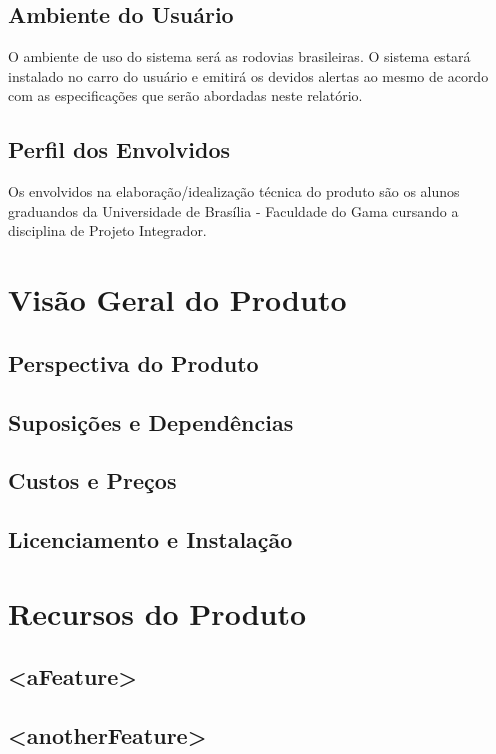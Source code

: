\subsection{Ambiente do Usuário}
O ambiente de uso do sistema será as rodovias brasileiras. O sistema estará instalado no carro do usuário e emitirá os devidos alertas ao mesmo de acordo com as especificações que serão abordadas neste relatório.

\subsection{Perfil dos Envolvidos}
Os envolvidos na elaboração/idealização técnica do produto são os alunos graduandos da Universidade de Brasília - Faculdade do Gama cursando a disciplina de Projeto Integrador.

\section{Visão Geral do Produto}

\subsection{Perspectiva do Produto}

\subsection{Suposições e Dependências}

\subsection{Custos e Preços}

\subsection{Licenciamento e Instalação}

\section{Recursos do Produto}

\subsection{<aFeature>}

\subsection{<anotherFeature>}


